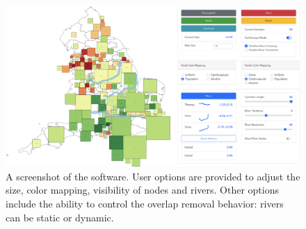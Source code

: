 {
\begin{figure}[htb!]
    \centering
    \includegraphics[width=\textwidth,keepaspectratio]{figure/UI.png}
    \caption{A screenshot of the software. User options are provided to adjust the size, color mapping, visibility of nodes and rivers. Other options include the ability to control the overlap removal behavior: rivers can be static or dynamic.}
    \label{fig:overview}
\end{figure}
}